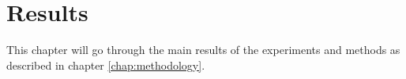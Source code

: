 \chapter{Results}
\label{ref:results}
This chapter will go through the main results of the experiments and methods as described in chapter \ref{chap:methodology}. 




